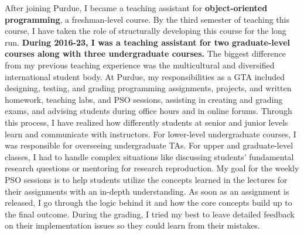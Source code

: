 \documentclass[9pt]{article}
\newcommand{\textcourse}[1]{\textit{#1}}
\begin{document}
After joining Purdue, I became a teaching assistant for 
\textbf{object-oriented programming}, a freshman-level course. By the third semester of teaching this course, 
I have taken the role of structurally developing this course for the long run.
\textbf{During 2016-23, I was a teaching assistant for two graduate-level courses 
along with three undergraduate courses.}
The biggest difference from my previous teaching experience was the multicultural and diversified international student body. At Purdue, my responsibilities as a GTA included designing, testing, and grading programming assignments, projects, and written homework, teaching labs, and PSO sessions, assisting in creating and grading exams, and advising students during office hours and in online forums. Through this process, I have realized how differently students at senior and junior levels learn and communicate with instructors. For lower-level undergraduate courses, I was responsible for overseeing undergraduate TAs. For upper and graduate-level classes, I had to handle complex situations like discussing students' fundamental research questions or mentoring for research reproduction. My goal for the weekly PSO sessions is to help students utilize the concepts learned in the lectures for their assignments with an in-depth understanding. As soon as an assignment is released, I go through the logic behind it and how the core concepts build up to the final outcome. 
%
During the grading, I tried my best to leave detailed feedback on their implementation issues so they could learn from their mistakes.
\end{document}
